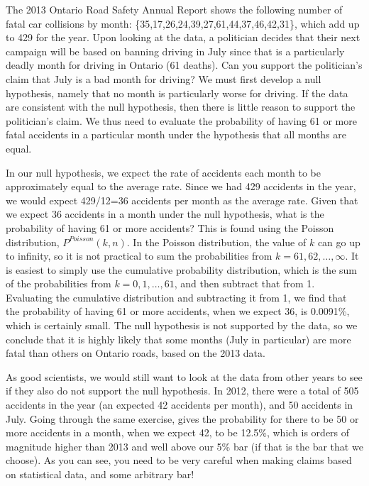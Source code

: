 \begin{example}{}{The 2013 Ontario Road Safety Annual Report shows the following number of fatal car collisions by month: \{35,17,26,24,39,27,61,44,37,46,42,31\}, which add up to 429 for the year. Upon looking at the data, a politician decides that their next campaign will be based on banning driving in July since that is a particularly deadly month for driving in Ontario (61 deaths). Can you support the politician's claim that July is a bad month for driving?}{}
We must first develop a null hypothesis, namely that no month is particularly worse for driving. If the data are consistent with the null hypothesis, then there is little reason to support the politician's claim. We thus need to evaluate the probability of having 61 or more fatal accidents in a particular month under the hypothesis that all months are equal. 

In our null hypothesis, we expect the rate of accidents each month to be approximately equal to the average rate. Since we had 429 accidents in the year, we would expect 429/12=36 accidents per month as the average rate. Given that we expect 36 accidents in a month under the null hypothesis, what is the probability of having 61 or more accidents? This is found using the Poisson distribution, $P^{Poisson}(k,n)$. In the Poisson distribution, the value of $k$ can go up to infinity, so it is not practical to sum the probabilities from $k=61, 62, \dots, \infty$. It is easiest to simply use the cumulative probability distribution, which is the sum of the probabilities from $k=0, 1, \dots, 61$, and then subtract that from 1.  Evaluating the cumulative distribution and subtracting it from 1, we find that the probability of having 61 or more accidents, when we expect 36, is 0.0091\%, which is certainly small. The null hypothesis is not supported by the data, so we conclude that it is highly likely that some months (July in particular) are more fatal than others on Ontario roads, based on the 2013 data.

As good scientists, we would still want to look at the data from other years to see if they also do not support the null hypothesis. In 2012, there were a total of 505 accidents in the year (an expected 42 accidents per month), and 50 accidents in July. Going through the same exercise, gives the probability for there to be 50 or more accidents in a month, when we expect 42, to be 12.5\%, which is orders of magnitude higher than 2013 and well above our 5\% bar (if that is the bar that we choose). As you can see, you need to be very careful when making claims based on statistical data, and some arbitrary bar!


\end{example}
